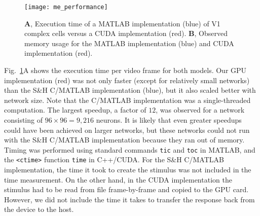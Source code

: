 \begin{figure}[t]
  \centering
  \texttt{[image: me\_performance]}
  \caption{
  \textbf{A}, Execution time of a MATLAB implementation (blue) of
  V1 complex cells versus a \ac{CUDA} implementation (red).
  \textbf{B}, Observed memory usage for the MATLAB implementation
  (blue) and \ac{CUDA} implementation (red).}
  \label{fig:ME|CUDA|performance}
\end{figure}

Fig.~\ref{fig:ME|CUDA|performance}A shows the execution time
per video frame for both models. Our \ac{GPU} implementation
(red) was not only faster (except for relatively small networks)
than the S\&H C/MATLAB implementation (blue), but it also
scaled better with network size. Note that the C/MATLAB implementation
was a single-threaded computation. The largest
speedup, a factor of $12$, was observed for a network consisting
of $96\times96=9,216$ neurons. It is likely that even greater
speedups could have been achieved on larger networks, but
these networks could not run with the S\&H C/MATLAB implementation
because they ran out of memory. Timing was
performed using standard commands \texttt{tic} and \texttt{toc} in
MATLAB, and the \texttt{<ctime>} function \texttt{time}
in C++/\ac{CUDA}.
For the S\&H C/MATLAB implementation, the time it took to
create the stimulus was not included in the time measurement.
On the other hand, in the \ac{CUDA} implementation the stimulus
had to be read from file frame-by-frame and copied to the
\ac{GPU} card. However, we did not include the time it takes to
transfer the response back from the device to the host.

